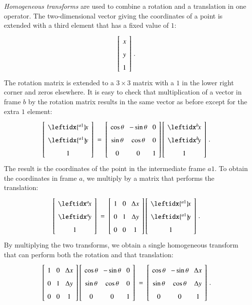 \emph{Homogeneous transforms} are used to combine a rotation and a translation in one operator. The two-dimensional vector giving the coordinates of a point is extended with a third element that has a fixed value of $1$:
\[
\spacearray
\left[\begin{array}{c}x\\y\\1\end{array}\right]\,.
\]
The rotation matrix is extended to a $3\times 3$ matrix with a $1$ in the lower right corner and zeros elsewhere. It is easy to check that multiplication of a vector in frame $b$ by the rotation matrix results in the same vector as before except for the extra $1$ element:
\[
\spacearray
\left[\begin{array}{c}\leftidx{^{a1}}\!{x}{}\\\leftidx{^{a1}}\!{y}{}\\1\end{array}\right]\;=\;
\left[\begin{array}{ccc}\cos\theta&-\sin\theta&0\\\sin\theta&\cos\theta&0\\0&0&1\end{array}\right]
\left[\begin{array}{c}\bx\\\by\\1\end{array}\right]\,.
\]
The result is the coordinates of the point in the intermediate frame $a1$. To obtain the coordinates in frame $a$, we multiply by a matrix that performs the translation:
\[
\spacearray
\left[\begin{array}{c}\ax\\\ay\\1\end{array}\right]\;=\;
\left[\begin{array}{ccc}1&0&\Delta x\\0&1&\Delta y\\0&0&1\end{array}\right]
\left[\begin{array}{c}\leftidx{^{a1}}\!{x}{}\\\leftidx{^{a1}}\!{y}{}\\1\end{array}\right]\,.
\]
By multiplying the two transforms, we obtain a single homogeneous transform that can perform both the rotation and that translation:
\[
\spacearray
\left[\begin{array}{ccc}1&0&\Delta x\\0&1&\Delta y\\0&0&1\end{array}\right]
\left[\begin{array}{ccc}\cos\theta&-\sin\theta&0\\\sin\theta&\cos\theta&0\\0&0&1\end{array}\right]\;=\;
\left[\begin{array}{ccc}\cos\theta&-\sin\theta&\Delta x\\\sin\theta&\cos\theta&\Delta y\\0&0&1\end{array}\right]\,.
\]

